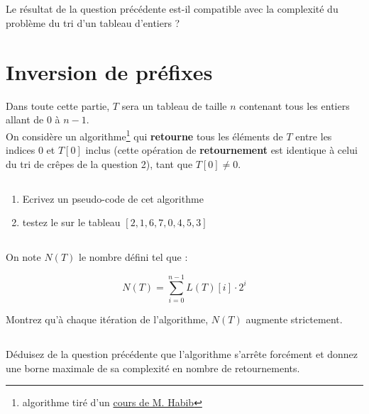 \documentclass
[12pt]
{article}
\begin{document}
\subsection{}

Le résultat de la question précédente est-il compatible avec la complexité du problème du tri d'un tableau d'entiers ?

\section{Inversion de préfixes}

Dans toute cette partie, $T$ sera un tableau de taille $n$ contenant tous les entiers allant de $0$ à $n-1$.
~\\

On considère un algorithme\footnote{algorithme tiré d'un \href{https://www.irif.fr/~habib/Documents/IntroAlgoL3.pdf}{cours de M. Habib}} qui {\bf retourne} tous les éléments de $T$ entre les indices 0 et $T[0]$ inclus (cette opération de {\bf retournement} est identique à celui du tri de crêpes de la question 2), tant que $T[0] \neq 0$.



\subsection{}

\begin{enumerate}
    \item Ecrivez un pseudo-code de cet algorithme
    \item testez le sur le tableau $[2, 1, 6, 7, 0, 4, 5, 3]$
\end{enumerate}


\subsection{}

On note $N(T)$ le nombre défini tel que : 

$$
N(T) = \sum_{i=0}^{n-1}L(T)[i]\cdot 2^{i}
$$

Montrez qu'à chaque itération de l'algorithme, $N(T)$ augmente strictement.

\subsection{}

Déduisez de la question précédente que l'algorithme s'arrête forcément et donnez une borne maximale de sa complexité en nombre de retournements.
\end{document}
